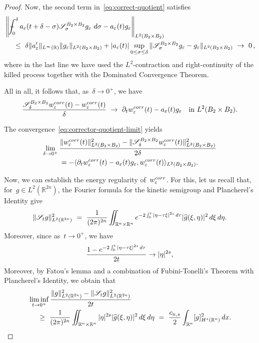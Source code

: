\documentclass[leqno,10pt]{amsart}
\theoremstyle{plain}
\theoremstyle{remark}
\numberwithin{equation}{section}
\def\dx{\,{\rm d}x}
\def \d{\,{\rm d}}
\def\er{\mathbb{R}}
\def\ern{\mathbb{R}^n}
\newcommand{\eps}{\varepsilon}
\def\Xint#1{\mathchoice
    {\XXint\displaystyle\textstyle{#1}}%
    {\XXint\textstyle\scriptstyle{#1}}%
    {\XXint\scriptstyle\scriptscriptstyle{#1}}%
    {\XXint\scriptscriptstyle\scriptscriptstyle{#1}}%
    \!\int}
\def\XXint#1#2#3{\setbox0=\hbox{$#1{#2#3}{\int}$}
    \vcenter{\hbox{$#2#3$}}\kern-0.5\wd0}
\def\bint{\Xint{-}}
\begin{document}
{\begin{proof}
Now, the second term in~\eqref{eq:correct-quotient} satisfies
\[
\begin{aligned}
&\left\|\bint_0^{\delta} a_\eps(t+\delta-\sigma)
 \mathscr{S}_{\sigma}^{B_2\times B_2}g_\eps\,\d \sigma-a_\eps(t)g_\eps\right\|_{L^2(B_2\times B_2)}\\
&\quad\ \leq\ \delta\|a_\eps'\|_{L^\infty(\er)}\|g_\eps\|_{L^2(B_2\times B_2)}
 +|a_\eps(t)|\sup_{0\leq \sigma\leq \delta}
 \|\mathscr{S}_{\sigma}^{B_2\times B_2}g_\eps-g_\eps\|_{L^2(B_2\times B_2)}
 \ \to\ 0\,,
\end{aligned}
\]
where in the last line we have used the $L^2$-contraction and right-continuity of the killed process together with the Dominated Convergence Theorem.

All in all, it follows that, as~$\delta\to 0^+$, we have
\begin{equation}\label{eq:corrector-quotient-limit}
\frac{\mathscr{S}_{\delta}^{B_2\times B_2}w_\eps^{\rm corr}(t)
             -w_\eps^{\rm corr}(t)}\delta
\ \to\
\partial_tw_\eps^{\rm corr}(t)-a_\eps(t)g_\eps
\quad\text{in}~L^2(B_2\times B_2).
\end{equation}

The convergence~\eqref{eq:corrector-quotient-limit} yields 
\begin{multline}\label{eq:corrector-limit}
\lim_{\delta\to 0^+}\frac{\|w_\eps^{\rm corr}(t)\|_{L^2(B_2\times B_2)}^2
 -\|\mathscr{S}_{\delta}^{B_2\times B_2}w_\eps^{\rm corr}(t)\|_{L^2(B_2\times B_2)}^2}{2\delta} \\
 = - \langle \partial_t w_\eps^{\rm corr}(t)-a_\eps(t)g_\eps, w^{\rm corr}_\eps(t)\rangle_{L^2(B_2\times B_2)}.
\end{multline}

Now, we can establish the energy regularity of~$w_\eps^{\rm corr}$. For this, let us recall that, for~$g\in L^2(\er^{2n})$, the Fourier formula for the kinetic semigroup and Plancherel's Identity give
\[
\|\mathscr{S}_tg\|_{L^2(\er^{2n})}^2 \ = \ \frac1{(2\pi)^{2n}}\iint_{\ern\times\ern}
 e^{-2\int_0^t|\eta-\tau\xi|^{2s}\d \tau}|\widehat g(\xi,\eta)|^2\d\xi\d\eta.
\]
Moreover, since as~$ t\to 0^+$, we have
\[
\frac{1-e^{-2\int_0^t|\eta-\tau\xi|^{2s}\d \tau}}{2t}
\to  |\eta|^{2s},
\]
Moreover, by Fatou's lemma and a combination of Fubini-Tonelli's Theorem with Plancherel's Identity, we obtain that
\[
\begin{aligned}
& \liminf_{t \to 0^+}\frac{\|g\|_{L^2(\er^{2n})}^2 -\|\mathscr{S}_t g\|_{L^2(\er^{2n})}^2}{2t}\\
& \quad  \ \geq\ \frac1{(2\pi)^{2n}}
 \iint_{\ern\times\ern}|\eta|^{2s}|\widehat{g}(\xi,\eta)|^2\d\xi\d\eta
 \ = \ \frac{c_{n,s}}2\int_{\ern}[g]^2_{H^s(\ern)}\dx.
\end{aligned}
\]




\end{proof}}
\end{document}
